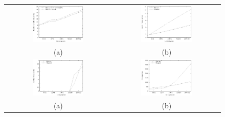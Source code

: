 \documentclass[acmtocl]{acmtrans2m}
\begin{document}
\begin{figure}
\centering
\begin{tabular}{cc}
\includegraphics[width=0.5\textwidth]{plots/shellsort_branch_misses.eps} & \includegraphics[width=0.5\textwidth]{plots/shell_heap_cache_misses.eps} \\
(a) & (b) \\
\includegraphics[width=0.5\textwidth]{plots/shell_heap_L2_misses.eps} & \includegraphics[width=0.5\textwidth]{plots/shell_heap_cycles.eps} \\
(a) & (b) \\
\end{tabular}

\end{figure}
\end{document}
